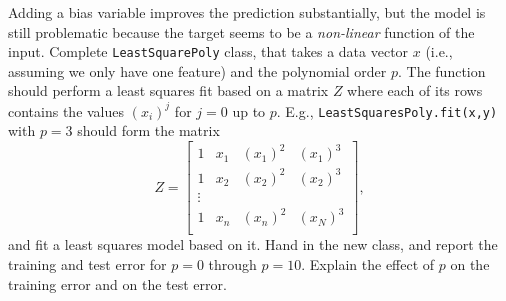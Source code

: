 \documentclass{article}
\def\blu#1{{\color{blu}#1}}
\begin{document}
Adding a bias variable improves the prediction substantially, but the model is still problematic because the target seems to be a \emph{non-linear} function of the input.
Complete \texttt{LeastSquarePoly} class, that takes a data vector $x$ (i.e., assuming we only have one feature) and the polynomial order $p$. The function should perform a least squares fit based on a matrix $Z$ where each of its rows contains the values $(x_{i})^j$ for $j=0$ up to $p$. E.g., \texttt{LeastSquaresPoly.fit(x,y)}  with $p = 3$ should form the matrix
\[
Z =
\left[\begin{array}{cccc}
1 & x_1 & (x_1)^2 & (x_1)^3\\
1 & x_2 & (x_2)^2 & (x_2)^3\\
\vdots\\
1 & x_n & (x_n)^2 & (x_N)^3\\
\end{array}
\right],
\]
and fit a least squares model based on it.
\blu{Hand in the new class, and report the training and test error for $p = 0$ through $p= 10$. Explain the effect of $p$ on the training error and on the test error.}
\end{document}
